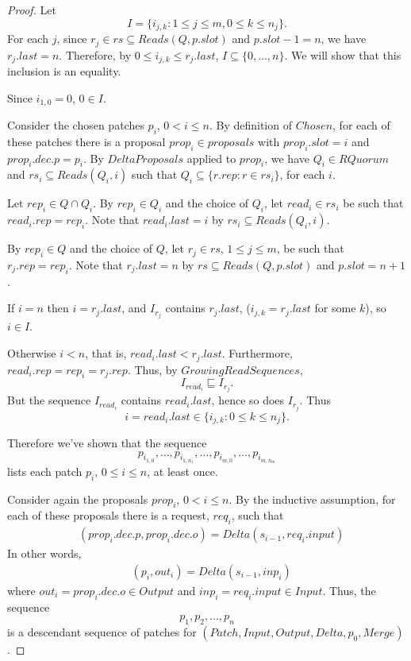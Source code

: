 \documentclass[12pt,a4paper,en]{pracamgr}
\begin{document}
\begin{proof}
    Let
    $$ I = \{i_{j, k}: 1 \le j \le m, 0 \le k \le n_j\}. $$
    For each $j$, since $r_j \in rs \subseteq Reads(Q, p.slot)$ and $p.slot - 1 = n$, we have $r_j.last = n$. Therefore, by $0 \le i_{j, k} \le r_j.last$, $I \subseteq \{0, \dots, n\}$. We will show that this inclusion is an equality.

    Since $i_{1, 0} = 0$, $0 \in I$.

    Consider the chosen patches $p_i$, $0 < i \le n$. By definition of $Chosen$, for each of these patches there is a proposal $prop_i \in proposals$ with $prop_i.slot = i$ and $prop_i.dec.p = p_i$. By $DeltaProposals$ applied to $prop_i$, we have $Q_i \in RQuorum$ and $rs_i \subseteq Reads(Q_i, i)$ such that $Q_i \subseteq \{r.rep: r \in rs_i\}$, for each $i$.

    Let $rep_i \in Q \cap Q_i$. By $rep_i \in Q_i$ and the choice of $Q_i$, let $read_i \in rs_i$ be such that $read_i.rep = rep_i$. Note that $read_i.last = i$ by $rs_i \subseteq Reads(Q_i, i)$.

    By $rep_i \in Q$ and the choice of $Q$, let $r_j \in rs$, $1 \le j \le m$, be such that $r_j.rep = rep_i$. Note that $r_j.last = n$ by $rs \subseteq Reads(Q, p.slot)$ and $p.slot = n + 1$.

    If $i = n$ then $i = r_j.last$, and $I_{r_j}$ contains $r_j.last$, ($i_{j, k} = r_j.last$ for some $k$), so $i \in I$.

    Otherwise $i < n$, that is, $read_i.last < r_j.last$. Furthermore, $read_i.rep = rep_i = r_j.rep$. Thus, by $GrowingReadSequences$,
    $$ I_{read_i} \sqsubseteq I_{r_j}. $$
    But the sequence $I_{read_i}$ contains $read_i.last$, hence so does $I_{r_j}$. Thus
    $$ i = read_i.last \in \{i_{j, k}: 0 \le k \le n_j\}. $$

    Therefore we've shown that the sequence
    $$ p_{i_{1, 0}}, \dots, p_{i_{1, n_1}}, \dots, p_{i_{m, 0}}, \dots, p_{i_{m, n_m}} $$
    lists each patch $p_i$, $0 \le i \le n$, at least once.

    Consider again the proposals $prop_i$, $0 < i \le n$. By the inductive assumption, for each of these proposals there is a request, $req_i$, such that
    \begin{align*}
        & (prop_i.dec.p, prop_i.dec.o) = Delta(s_{i-1}, req_i.input)
    \end{align*}
    In other words,
    \begin{align*}
        & (p_i, out_i) = Delta(s_{i-1}, inp_i)
    \end{align*}
    where $out_i = prop_i.dec.o \in Output$ and $inp_i = req_i.input \in Input$. Thus, the sequence
    $$ p_1, p_2, \dots, p_n $$
    is a descendant sequence of patches for $(Patch, Input, Output, Delta, p_0, Merge)$.


\end{proof}
\end{document}
